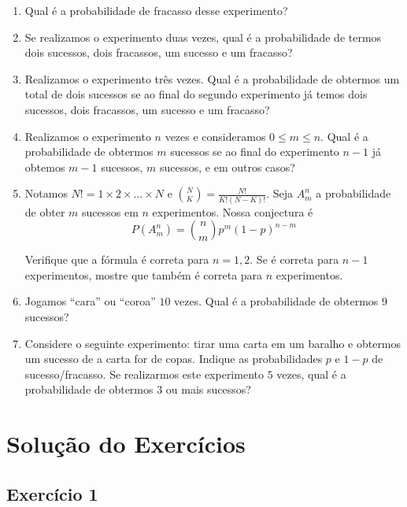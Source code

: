 \begin{enumerate}
  \item Qual é a probabilidade de fracasso desse experimento?
  \item Se realizamos o experimento duas vezes, qual é a probabilidade
    de termos dois sucessos, dois fracassos, um sucesso e um fracasso?
  \item Realizamos o experimento três vezes. Qual é a probabilidade de
    obtermos um total de dois sucessos se ao final do segundo experimento já temos
    dois sucessos, dois fracassos, um sucesso e um fracasso?
  \item Realizamos o experimento $n$ vezes e consideramos $0 \leq m \leq n$.
    Qual é a probabilidade de obtermos $m$ sucessos se ao final do
    experimento $n-1$ já obtemos $m-1$ sucessos, $m$ sucessos, e em outros
    casos?
  \item Notamos $N! = 1 \times 2 \times \ldots \times N$ e
    $\binom{N}{K} = \frac{N!}{{K!}{(N-K)!}}$. Seja $A_m^n$ a probabilidade
    de obter $m$ sucessos em $n$ experimentos. Nossa conjectura é
    $$
    P(A_m^n) = \binom{n}{m} p^m \left(1-p\right)^{n-m}
    $$
   
    Verifique que a fórmula é correta para $n = 1, 2$. Se é correta para $n - 1$
    experimentos, mostre que também é correta para $n$ experimentos.
  \item Jogamos ``cara'' ou ``coroa'' $10$ vezes. Qual é a probabilidade de
    obtermos 9 sucessos?
  \item Considere o seguinte experimento: tirar uma carta em um baralho e
    obtermos um sucesso de a carta for de copas. Indique as probabilidades $p$ e
    $1 - p$ de sucesso/fracasso. Se realizarmos este experimento $5$ vezes, qual
    é a probabilidade de obtermos $3$ ou mais sucessos?
\end{enumerate}

\section{Solução do Exercícios}

\subsection*{Exercício 1}


